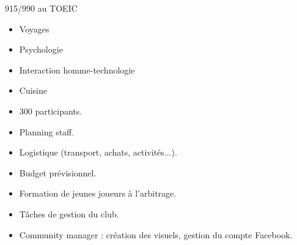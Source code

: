 915/990 au TOEIC



\sidedivider



\begin{itemize}
    \item Voyages
    \item Psychologie
    \item Interaction homme-technologie
    \item Cuisine
\end{itemize}


\begin{itemize}
    \item 300 participants.
    \item Planning staff.
    \item Logistique (transport, achats, activités...).
    \item Budget prévisionnel.
\end{itemize}
\sidedivider

\begin{itemize}
    \item Formation de jeunes joueurs à l'arbitrage.
    \item Tâches de gestion du club.
    \item Community manager : création des visuels, gestion du compte Facebook.
\end{itemize}

